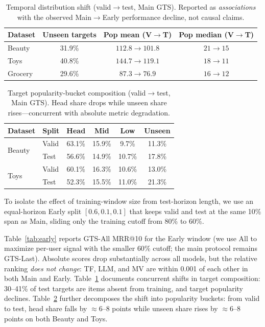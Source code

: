 \documentclass[sigconf,natbib=true,anonymous]{acmart}
\begin{document}
\begin{table}[t]
\centering
\caption{%
Temporal distribution shift (valid$\to$test, Main GTS).
Reported as \emph{associations} with the observed Main$\to$Early performance decline, not causal claims.%
}
\label{tab:shift}
\small
\setlength{\tabcolsep}{4pt}
\begin{tabular}{@{}lccc@{}}
\toprule
Dataset & Unseen targets & Pop mean (V$\to$T) & Pop median (V$\to$T) \\
\midrule
Beauty  & 31.9\% & $112.8 \to 101.8$ & $21 \to 15$ \\
Toys    & 40.8\% & $144.7 \to 119.1$ & $18 \to 11$ \\
Grocery & 29.6\% & $87.3 \to 76.9$ & $16 \to 12$ \\
\bottomrule
\end{tabular}
\end{table}

\begin{table}[t]
\centering
\caption{%
Target popularity-bucket composition (valid$\to$test, Main GTS).
Head share drops while unseen share rises---concurrent with absolute metric degradation.%
}
\label{tab:bucket}
\small
\setlength{\tabcolsep}{3.5pt}
\begin{tabular}{@{}llcccc@{}}
\toprule
Dataset & Split & Head & Mid & Low & Unseen \\
\midrule
\multirow{2}{*}{Beauty}
 & Valid & 63.1\% & 15.9\% & 9.7\% & 11.3\% \\
 & Test  & 56.6\% & 14.9\% & 10.7\% & 17.8\% \\
\midrule
\multirow{2}{*}{Toys}
 & Valid & 60.1\% & 16.3\% & 10.6\% & 13.0\% \\
 & Test  & 52.3\% & 15.5\% & 11.0\% & 21.3\% \\
\bottomrule
\end{tabular}
\end{table}

To isolate the effect of training-window size from test-horizon length, we use an equal-horizon Early split $[0.6, 0.1, 0.1]$ that keeps valid and test at the same 10\% span as Main, sliding only the training cutoff from 80\% to 60\%.

Table~\ref{tab:early} reports GTS-All MRR@10 for the Early window (we use All to maximize per-user signal with the smaller $60\%$ cutoff; the main protocol remains GTS-Last).
Absolute scores drop substantially across all models, but the relative ranking \emph{does not change}: TF, LLM, and MV are within 0.001 of each other in both Main and Early.
Table~\ref{tab:shift} documents concurrent shifts in target composition: 30--41\% of test targets are items absent from training, and target popularity declines.
Table~\ref{tab:bucket} further decomposes the shift into popularity buckets: from valid to test, head share falls by $\approx$6--8 points while unseen share rises by $\approx$6--8 points on both Beauty and Toys.
\end{document}
